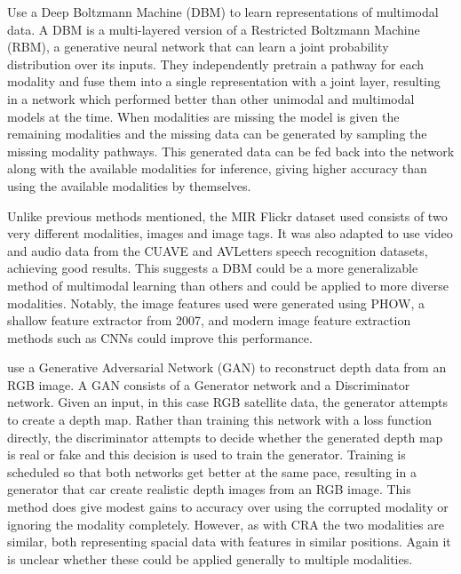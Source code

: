 \cite{DBM} Use a Deep Boltzmann Machine (DBM) to learn representations of multimodal data. A DBM is a multi-layered version of a Restricted Boltzmann Machine (RBM), a generative neural network that can learn a joint probability distribution over its inputs. They independently pretrain a pathway for each modality and fuse them into a single representation with a joint layer, resulting in a network which performed better than other unimodal and multimodal models at the time. When modalities are missing the model is given the remaining modalities and the missing data can be generated by sampling the missing modality pathways. This generated data can be fed back into the network along with the available modalities for inference, giving higher accuracy than using the available modalities by themselves.

Unlike previous methods mentioned, the MIR Flickr dataset used consists of two very different modalities, images and image tags. It was also adapted to use video and audio data from the CUAVE and AVLetters speech recognition datasets, achieving good results. This suggests a DBM could be a more generalizable method of multimodal learning than others and could be applied to more diverse modalities. Notably, the image features used were generated using PHOW, a shallow feature extractor from 2007, and modern image feature extraction methods such as CNNs could improve this performance. 

\cite{GANFootprint} use a Generative Adversarial Network (GAN) to reconstruct depth data from an RGB image. A GAN consists of a Generator network and a Discriminator network. Given an input, in this case RGB satellite data, the generator attempts to create a depth map. Rather than training this network with a loss function directly, the discriminator attempts to decide whether the generated depth map is real or fake and this decision is used to train the generator. Training is scheduled so that both networks get better at the same pace, resulting in a generator that car create realistic depth images from an RGB image. 
This method does give modest gains to accuracy over using the corrupted modality or ignoring the modality completely. However, as with CRA the two modalities are similar, both representing spacial data with features in similar positions. Again it is unclear whether these could be applied generally to multiple modalities.

